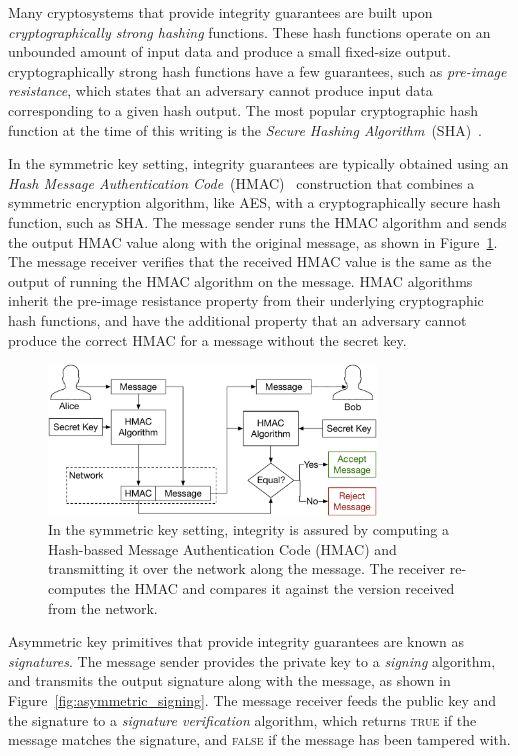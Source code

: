 Many cryptosystems that provide integrity guarantees are built upon
\textit{cryptographically strong hashing} functions. These hash functions
operate on an unbounded amount of input data and produce a small fixed-size
output. cryptographically strong hash functions have a few guarantees, such as
\textit{pre-image resistance}, which states that an adversary cannot produce
input data corresponding to a given hash output. The most popular cryptographic
hash function at the time of this writing is the
\textit{Secure Hashing Algorithm}~(SHA)~\cite{eastlake2001sha1}.

In the symmetric key setting, integrity guarantees are typically obtained using
an \textit{Hash Message Authentication Code}~(HMAC)~\cite{krawczyk1997hmac}
construction that combines a symmetric encryption algorithm, like AES, with a
cryptographically secure hash function, such as SHA. The message sender runs
the HMAC algorithm and sends the output HMAC value along with the original
message, as shown in Figure~\ref{fig:symmetric_hmac}. The message receiver
verifies that the received HMAC value is the same as the output of running the
HMAC algorithm on the message. HMAC algorithms inherit the pre-image resistance
property from their underlying cryptographic hash functions, and have the
additional property that an adversary cannot produce the correct HMAC for a
message without the secret key.

\begin{figure}[hbt]
  \centering
  \includegraphics[width=87mm]{figures/symmetric_hmac.pdf}
  \caption{
    In the symmetric key setting, integrity is assured by computing a
    Hash-bassed Message Authentication Code (HMAC) and transmitting it over the
    network along the message. The receiver re-computes the HMAC and compares
    it against the version received from the network.
  }
  \label{fig:symmetric_hmac}
\end{figure}

Asymmetric key primitives that provide integrity guarantees are known as
\textit{signatures}. The message sender provides the private key to a
\textit{signing} algorithm, and transmits the output signature along with the
message, as shown in Figure~\ref{fig:asymmetric_signing}. The message receiver
feeds the public key and the signature to a \textit{signature verification}
algorithm, which returns \textsc{true} if the message matches the signature,
and \textsc{false} if the message has been tampered with.

